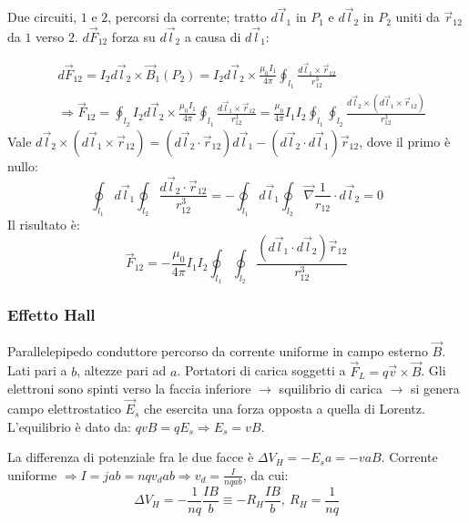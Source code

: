 \documentclass[10pt, a4paper]{scrartcl}
\numberwithin{equation}{subsection}
\theoremstyle{style1}
\begin{document}
Due circuiti, $1$ e $2$, percorsi da corrente; tratto $d\vec{l}_1$ in $P_1$ e $d\vec{l}_2$ in $P_2$ uniti da $\vec{r}_{12} $ da $1$ verso $2$. $d\vec{F}_{12} $ forza su $d\vec{l}_2$ a causa di $d\vec{l}_1$:

\begin{equation}
	\begin{split}
		& d\vec{F}_{12}  = I_2d\vec{l}_2 \times \vec{B}_1 (P_2) = I_2d\vec{l}_2\times \frac{\mu_0 I_1}{4\pi}\oint_{l_1} \frac{d\vec{l}_1 \times \vec{r}_{12} }{r_{12} ^3}\\
		&\Rightarrow \vec{F}_{12}  = \oint_{l_2} I_2d\vec{l}_2 \times \frac{\mu_0 I_1}{4\pi}\oint_{l_1} \frac{d\vec{l}_1 \times \vec{r}_{12} }{r_{12} ^3} = \frac{\mu_0}{4\pi}I_1I_2 \oint_{l_1} \oint_{l_2} \frac{d\vec{l}_2 \times (d\vec{l}_1 \times \vec{r}_{12}) }{r_{12} ^3}
	\end{split}
\end{equation}
Vale $d\vec{l}_2 \times (d\vec{l}_1 \times  \vec{r}_{12} ) = (d\vec{l}_2 \cdot  \vec{r}_{12}) d\vec{l}_1 - (d\vec{l}_2 \cdot d\vec{l}_1) \vec{r}_{12}  $, dove il primo \`e nullo:
\[
	\oint_{l_1} d\vec{l}_1 \oint_{l_2} \frac{d\vec{l}_2 \cdot \vec{r}_{12} }{r_{12}^3}= - \oint_{l_1}d\vec{l}_1 \oint_{l_2} \vec{\nabla } \frac{1}{r_{12}} \cdot d\vec{l}_2 = 0 
\] 
Il risultato \`e:
\begin{equation}
	\vec{F}_{12} = -\frac{\mu_0 }{4\pi}I_1I_2 \oint_{l_1} \oint_{l_2} \frac{(d\vec{l}_1\cdot d\vec{l}_2) \vec{r}_{12} }{r_{12}^3}
\end{equation}
\subsubsection{Effetto Hall}

Parallelepipedo conduttore percorso da corrente uniforme in campo esterno $\vec{B}$. Lati pari a $b$, altezze pari ad $a$. Portatori di carica soggetti a $\vec{F}_L = q \vec{v} \times \vec{B}$. Gli elettroni sono spinti verso la faccia inferiore $\to$ squilibrio di carica $\to $ si genera campo elettrostatico $\vec{E}_s$ che esercita una forza opposta a quella di Lorentz. L'equilibrio \`e dato da: $qv B = q E_s\Rightarrow E_s = v B$.

La differenza di potenziale fra le due facce \`e $\Delta V_H = - E_s a = - v a B$. Corrente uniforme $\Rightarrow I=jab = n q v_d ab \Rightarrow v_d =  \frac{I}{nqab}$, da cui:
\begin{equation}
	\Delta V_H = -\frac{1}{nq} \frac{IB}{b} \equiv - R_H \frac{IB}{b}, \ R_H = \frac{1}{nq}
\end{equation}
\end{document}
